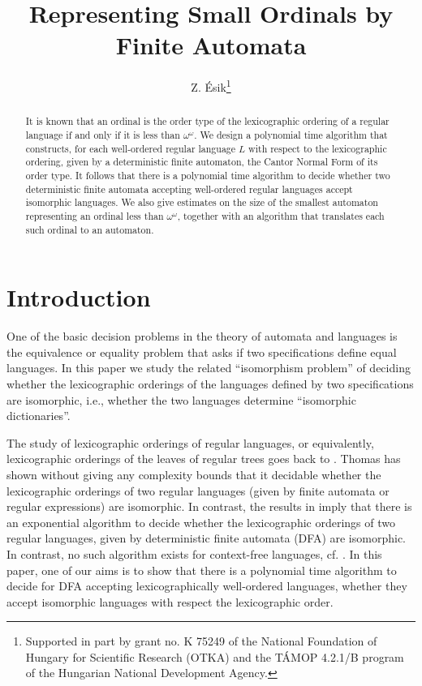 \documentclass[copyright]{eptcs}
\title{Representing Small Ordinals by Finite Automata}
\author{Z. \'Esik\thanks{Supported in part by grant no. K 75249 of the National Foundation of
Hungary for Scientific Research (OTKA) and the T\'AMOP 4.2.1/B program of the Hungarian National Development Agency.}
\institute{
Dept. of Computer Science\\
University of Szeged\\
Hungary}
\email{ze@inf.u-szeged.hu}
}
\begin{document}
\maketitle


\begin{abstract}
It is known that an ordinal is the order type of the lexicographic
ordering of a regular language if and only if it is less than
$\omega^\omega$. We design a polynomial time algorithm that 
constructs, for each  well-ordered regular language $L$
with respect to the lexicographic ordering, given by a deterministic 
finite automaton, the Cantor Normal Form of its order type. It follows that 
there is a polynomial time algorithm to decide whether two  
deterministic finite automata accepting well-ordered regular 
languages accept isomorphic languages.    
We also give estimates on the size of the smallest automaton
representing an ordinal less than $\omega^\omega$, together with
an algorithm that translates each such ordinal to an automaton.
\end{abstract} 



\section{Introduction}

One of the basic decision problems in the theory of automata and languages
is the equivalence or equality problem that asks if two specifications
define equal languages. In this paper we study the related ``isomorphism problem''
of deciding whether the lexicographic orderings of the languages 
defined by two specifications are isomorphic, i.e., whether 
the two languages determine ``isomorphic dictionaries''.  


The study of lexicographic orderings of regular languages, or equivalently, 
lexicographic orderings of the leaves of regular trees goes back
to \cite{Courcelle}. 
Thomas \cite{Thomas} has shown without giving any 
complexity bounds that it decidable whether the lexicographic orderings of two regular languages 
(given by finite automata or regular expressions) are isomorphic.
In contrast, the results in \cite{BEregwords} imply that there is an exponential 
algorithm to decide whether the lexicographic orderings 
of two regular languages, given by deterministic finite automata (DFA) 
are isomorphic. In contrast, no such algorithm exists
for context-free languages, cf. \cite{EsCF}.
In this paper, one of our aims is to show that there is a polynomial time 
algorithm to decide for DFA accepting lexicographically well-ordered 
languages, whether they accept isomorphic languages with respect
the lexicographic order.
\end{document}
